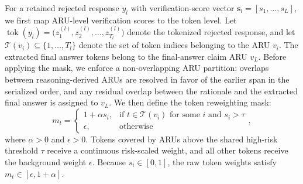 \documentclass[a4paper,fleqn,doubleblind]{cas-sc}
\begin{document}
For a retained rejected response $y_l$ with verification-score vector $\mathbf{s}_l=[s_1,\dots,s_L]$, we first map ARU-level verification scores to the token level. Let $\operatorname{tok}(y_l) = \big(z^{(l)}_1, z^{(l)}_2, \dots, z^{(l)}_{T_l}\big)$ denote the tokenized rejected response, and let $\mathcal{T}(v_i) \subseteq \{1, \dots, T_l\}$ denote the set of token indices belonging to the ARU $v_i$. The extracted final answer tokens belong to the final-answer claim ARU $v_L$. Before applying the mask, we enforce a non-overlapping ARU partition: overlaps between reasoning-derived ARUs are resolved in favor of the earlier span in the serialized order, and any residual overlap between the rationale and the extracted final answer is assigned to $v_L$. We then define the token reweighting mask:
\begin{equation}
\label{eq:topology_mask}
m_t =
\begin{cases}
1+\alpha s_i, & \text{if } t \in \mathcal{T}(v_i) \text{ for some } i \text{ and } s_i > \tau \\
\epsilon, & \text{otherwise}
\end{cases},
\end{equation}
where $\alpha>0$ and $\epsilon>0$. Tokens covered by ARUs above the shared high-risk threshold $\tau$ receive a continuous risk-scaled weight, and all other tokens receive the background weight $\epsilon$. Because $s_i\in[0,1]$, the raw token weights satisfy $m_t\in[\epsilon,1+\alpha]$.
\end{document}
